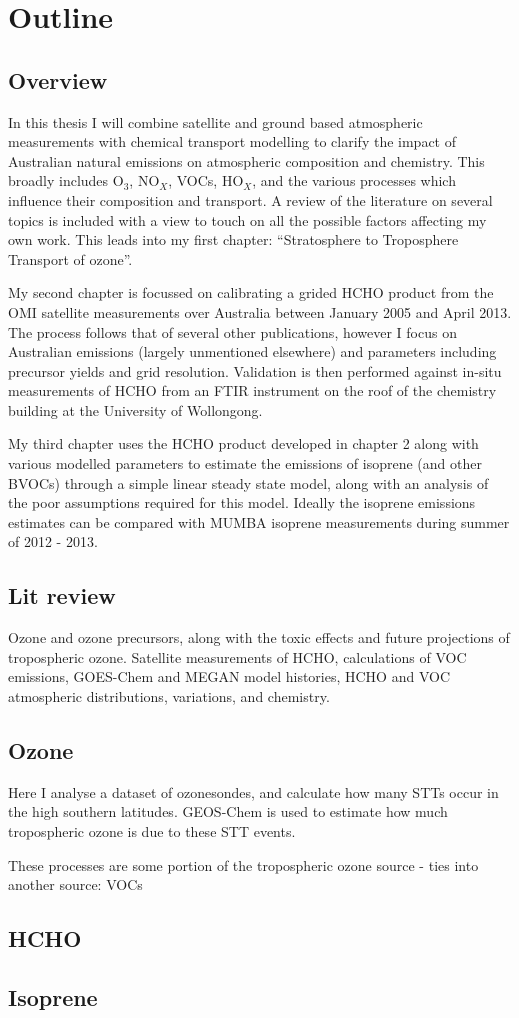\chapter{Outline}

  \section{Overview}
    In this thesis I will combine satellite and ground based atmospheric measurements with chemical transport modelling to clarify the impact of Australian natural emissions on atmospheric composition and chemistry.
    This broadly includes O$_3$, NO$_X$, VOCs, HO$_X$, and the various processes which influence their composition and transport.
    A review of the literature on several topics is included with a view to touch on all the possible factors affecting my own work.
    This leads into my first chapter: ``Stratosphere to Troposphere Transport of ozone''.
    
    My second chapter is focussed on calibrating a grided HCHO product from the OMI satellite measurements over Australia between January 2005 and April 2013.
    The process follows that of several other publications, however I focus on Australian emissions (largely unmentioned elsewhere) and parameters including precursor yields and grid resolution.
    Validation is then performed against in-situ measurements of HCHO from an FTIR instrument on the roof of the chemistry building at the University of Wollongong.
    
    My third chapter uses the HCHO product developed in chapter 2 along with various modelled parameters to estimate the emissions of isoprene (and other BVOCs) through a simple linear steady state model, along with an analysis of the poor assumptions required for this model.
    Ideally the isoprene emissions estimates can be compared with MUMBA isoprene measurements during summer of 2012 - 2013.
     
  \section{Lit review}
    Ozone and ozone precursors, along with the toxic effects and future projections of tropospheric ozone.
    Satellite measurements of HCHO, calculations of VOC emissions, GOES-Chem and MEGAN model histories, HCHO and VOC atmospheric distributions, variations, and chemistry.
  
  \section{Ozone}
      Here I analyse a dataset of ozonesondes, and calculate how many STTs occur in the high southern latitudes.
      GEOS-Chem is used to estimate how much tropospheric ozone is due to these STT events.
      
      These processes are some portion of the tropospheric ozone source - ties into another source: VOCs
  \section{HCHO}
      
  \section{Isoprene}